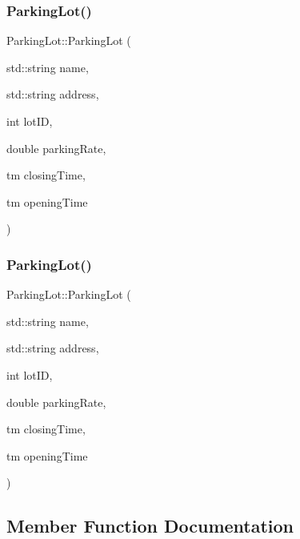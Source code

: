 \subsubsection{\texorpdfstring{Parking\+Lot()}{ParkingLot()}\hspace{0.1cm}{\footnotesize\ttfamily [1/2]}}
{\footnotesize\ttfamily Parking\+Lot\+::\+Parking\+Lot (\begin{DoxyParamCaption}\item[{std\+::string}]{name,  }\item[{std\+::string}]{address,  }\item[{int}]{lot\+ID,  }\item[{double}]{parking\+Rate,  }\item[{tm}]{closing\+Time,  }\item[{tm}]{opening\+Time }\end{DoxyParamCaption})}

\mbox{\label{class_parking_lot_af06c47fd4a50e7b2215cf2867876cc0c}} 
\subsubsection{\texorpdfstring{Parking\+Lot()}{ParkingLot()}\hspace{0.1cm}{\footnotesize\ttfamily [2/2]}}
{\footnotesize\ttfamily Parking\+Lot\+::\+Parking\+Lot (\begin{DoxyParamCaption}\item[{std\+::string}]{name,  }\item[{std\+::string}]{address,  }\item[{int}]{lot\+ID,  }\item[{double}]{parking\+Rate,  }\item[{tm}]{closing\+Time,  }\item[{tm}]{opening\+Time }\end{DoxyParamCaption})}



\subsection{Member Function Documentation}
\mbox{\label{class_parking_lot_a8a52aa523041af660f59ac566f7af780}} 

